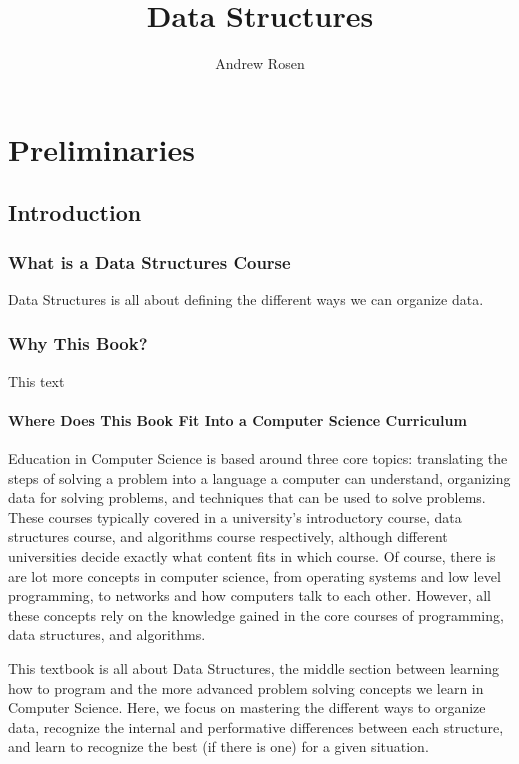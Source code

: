 \documentclass[10pt,a4paper]{book}
\begin{document}
\title{Data Structures}
\author{Andrew Rosen}
\date{}
\maketitle
\tableofcontents

\part{Preliminaries}

\chapter{Introduction}

\section{What is a Data Structures Course}
Data Structures is all about defining the different ways we can organize data.


\section{Why This Book?}

This text


\subsection{Where Does This Book Fit Into a Computer Science Curriculum }

Education in Computer Science is based around three core topics: translating the steps of solving a problem into a language a computer can understand, organizing data for solving problems, and techniques that can be used to solve problems. %
These courses typically covered in a university's introductory course, data structures course, and algorithms course respectively, although different universities decide exactly what content fits in which course.
Of course, there is are lot more concepts in computer science, from operating systems and low level programming,  to networks and how computers talk to each other. However, all these concepts rely on the knowledge gained in the core courses of programming, data structures, and algorithms.

 

This textbook is all about Data Structures, the middle section between learning how to program and the more advanced problem solving concepts we learn in Computer Science. 
Here, we focus on mastering the different ways to organize data, recognize the internal and performative differences between each structure, and learn to recognize the best (if there is one) for a given situation.
\end{document}
